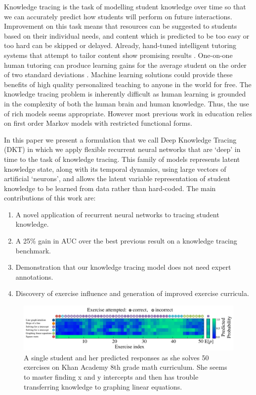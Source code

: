 Knowledge tracing is the task of modelling student knowledge over time so that we can accurately predict how students will perform on future interactions.  Improvement on this task means that resources can be suggested to students based on their individual needs, and content which is predicted to be too easy or too hard
can be skipped or delayed. Already, hand-tuned intelligent tutoring systems that attempt to tailor content show promising results \cite{polson2013foundations}. %
One-on-one human tutoring 
can produce learning gains for the average student on the order of two standard deviations \cite{corbett2001cognitive}.
Machine learning solutions could provide these benefits of 
high quality personalized teaching to anyone in the world for free. The knowledge tracing problem is inherently difficult as human learning is grounded in the complexity of both the human brain and human knowledge.
Thus, the use of rich models seems appropriate.
However most previous work in education relies on first order Markov models with restricted functional forms.

In this paper we present a formulation that we call Deep Knowledge Tracing (DKT) in which we apply flexible recurrent neural networks that are `deep' in time to the task of knowledge tracing. 
This family of models represents latent knowledge state, along with its temporal dynamics, using large vectors of artificial `neurons', and allows the latent variable representation of student knowledge to be learned from data rather than hard-coded.
The main contributions of this work are:
\begin{enumerate}
\item A novel application of recurrent neural networks to tracing student knowledge.
\item A 25\% gain in AUC over the best previous result on a knowledge tracing benchmark. 
\item Demonstration that our knowledge tracing model does not need expert annotations.
\item Discovery of exercise influence and generation of improved exercise curricula.
\end{enumerate}

\begin{figure}[t]
\centering
\includegraphics[width=1.0\textwidth]{img/singleStudent}

\caption{A single student and her predicted responses as she solves 50 exercises on Khan Academy 8th grade math curriculum. She seems to master finding x and y intercepts and then has trouble transferring knowledge to graphing linear equations.
\label{fig:singleStudent}
}

\end{figure}


